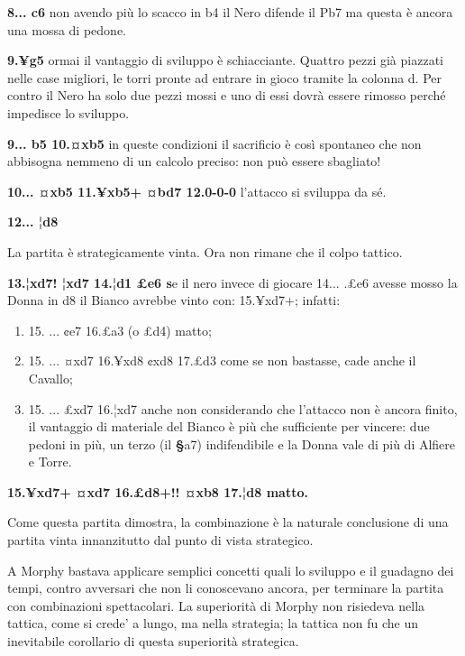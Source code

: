 \textbf{8... c6} non avendo più lo scacco in b4 il Nero difende il Pb7
ma questa è ancora una mossa di pedone.

\textbf{9.¥g5} ormai il vantaggio di sviluppo è schiacciante. Quattro
pezzi già piazzati nelle case migliori, le torri pronte ad entrare in
gioco tramite la colonna d. Per contro il Nero ha solo due pezzi mossi e
uno di essi dovrà essere rimosso perché impedisce lo sviluppo.

\textbf{9... b5 10.¤xb5} in queste condizioni il sacrificio è così
spontaneo che non abbisogna nemmeno di un calcolo preciso: non può
essere sbagliato!

\textbf{10... ¤xb5 11.¥xb5+ ¤bd7 12.0-0-0} l'attacco si sviluppa da sé.

\textbf{12... ¦d8}


La partita è strategicamente vinta. Ora non rimane che il colpo tattico.

\textbf{13.¦xd7! ¦xd7 14.¦d1 £e6 s}e il nero invece di giocare 14...
.£e6 avesse mosso la Donna in d8 il Bianco avrebbe vinto con: 15.¥xd7+;
infatti:

\begin{enumerate}
\def\labelenumi{\alph{enumi})}
\item
  15. ... ¢e7 16.£a3 (o £d4) matto;
\item
  15. ... ¤xd7 16.¥xd8 ¢xd8 17.£d3 come se non bastasse, cade anche il
  Cavallo;
\item
  15. ... £xd7 16.¦xd7 anche non considerando che l'attacco non è ancora
  finito, il vantaggio di materiale del Bianco è più che sufficiente per
  vincere: due pedoni in più, un terzo (il \textbf{§}a7) indifendibile e
  la Donna vale di più di Alfiere e Torre.
\end{enumerate}

\textbf{15.¥xd7+ ¤xd7 16.£d8+!! ¤xb8 17.¦d8 matto.}

Come questa partita dimostra, la combinazione è la naturale conclusione
di una partita vinta innanzitutto dal punto di vista strategico.

A Morphy bastava applicare semplici concetti quali lo sviluppo e il
guadagno dei tempi, contro avversari che non li conoscevano ancora, per
terminare la partita con combinazioni spettacolari. La superiorità di
Morphy non risiedeva nella tattica, come si crede' a lungo, ma nella
strategia; la tattica non fu che un inevitabile corollario di questa
superiorità strategica.
